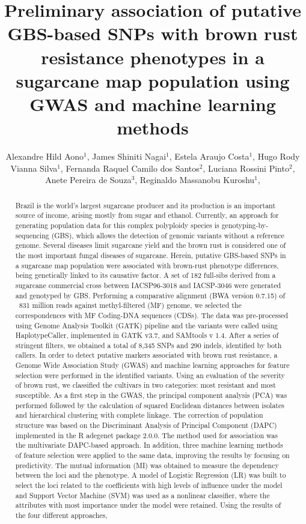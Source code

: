 \documentclass[twoside]{article}
\title{\vspace{-15mm}\fontsize{24pt}{10pt}\selectfont\textbf{ Preliminary association of putative GBS-based SNPs with brown rust resistance phenotypes in a sugarcane map population using GWAS and machine learning methods }} %
\author{ Alexandre Hild Aono$^{1}$, James Shiniti Nagai$^{1}$, Estela Araujo Costa$^{1}$, Hugo Rody Vianna Silva$^{1}$, Fernanda Raquel Camilo dos Santos$^{2}$, Luciana Rossini Pinto$^{2}$, Anete Pereira de Souza$^{3}$, Reginaldo Massanobu Kuroshu$^{1}$, }
\affil{ 1 Universidade Federal de São Paulo

2 Instituto Agronômico de Campinas

3 Universidade Estadual de Campinas

 }
\date{}
\begin{document}
  
  
  \maketitle %
  
  
  \thispagestyle{fancy} %
  
  
  \begin{abstract}
  Brazil is the world's largest sugarcane producer and its production is an important source of income, arising mostly from sugar and ethanol. Currently, an approach for generating population data for this complex polyploidy species is genotyping-by-sequencing (GBS), which allows the detection of genomic variants without a reference genome. Several diseases limit sugarcane yield and the brown rust is considered one of the most important fungal diseases of sugarcane. Herein, putative GBS-based SNPs in a sugarcane map population were associated with brown-rust phenotype differences, being genetically linked to its causative factor. A set of 182 full-sibs derived from a sugarcane commercial cross between IACSP96-3018 and IACSP-3046 were generated and genotyped by GBS. Performing a comparative alignment (BWA version 0.7.15) of ~831 million reads against methyl-filtered (MF) genome, we selected the correspondences with MF Coding-DNA sequences (CDSs). The data was pre-processed using Genome Analysis Toolkit (GATK) pipeline and the variants were called using HaplotypeCaller, implemented in GATK v3.7, and SAMtools v 1.4. After a series of stringent filters, we obtained a total of 8,345 SNPs and 290 indels, identified by both callers. In order to detect putative markers associated with brown rust resistance, a Genome Wide Association Study (GWAS) and machine learning approaches for feature selection were performed in the identified variants. Using an evaluation of the severity of brown rust, we classified the cultivars in two categories: most resistant and most susceptible. As a first step in the GWAS, the principal component analysis (PCA) was performed followed by the calculation of squared Euclidean distances between isolates and hierarchical clustering with complete linkage. The correction of population structure was based on the Discriminant Analysis of Principal Component (DAPC) implemented in the R adegenet package 2.0.0. The method used for association was the multivariate DAPC-based approach. In addition, three machine learning methods of feature selection were applied to the same data, improving the results by focusing on predictivity. The mutual information (MI) was obtained to measure the dependency between the loci and the phenotype. A model of Logistic Regression (LR) was built to select the loci related to the coefficients with high levels of influence under the model and Support Vector Machine (SVM) was used as a nonlinear classifier, where the attributes with most importance under the model were retained. Using the results of the four different approaches, 
\end{abstract}
\end{document}
